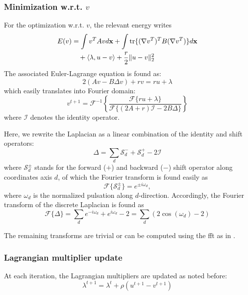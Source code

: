 \subsubsection{Minimization w.r.t. $v$}
For the optimization w.r.t. $v$, the relevant energy writes
\begin{align}
E(v) &= \int v^T A v d\mathbf{x} + \int \operatorname{tr}\{(\nabla v^T)^T B (\nabla v^T)\} d\mathbf{x}\\
&\quad + \langle \lambda, u-v \rangle + \frac{r}{2} \| u - v \|_2^2\nonumber
\end{align}
The associated Euler-Lagrange equation is found as:
\begin{equation}
2 ( A v - B \Delta v ) + rv = ru + \lambda
\end{equation}
which easily translates into Fourier domain:
\begin{equation}
v^{t+1} = \mathcal{F}^{-1}\left\{ \frac{\mathcal{F}\{ru + \lambda\}}{\mathcal{F}\{( 2 A+r)\mathcal{I}-2 B \Delta\}} \right\}
\end{equation}
where $\mathcal{I}$ denotes the identity operator.

Here, we rewrite the Laplacian as a linear combination of the identity and shift operators:
\begin{equation}
\Delta = \sum\limits_d \mathcal{S}_d^- + \mathcal{S}_d^+ - 2 \mathcal{I}
\end{equation}
where $\mathcal{S}_{d}^{\pm}$ stands for the forward ($+$) and backward ($-$) shift 
operator along coordinates axis $d$, of which the Fourier transform is found easily as
\begin{equation}
\mathcal{F}\{\mathcal{S}_{d}^{\pm}\} = e^{\pm i\omega_{d}},
\end{equation}
where $\omega_{d}$ is the normalized pulsation along $d$-direction. Accordingly, the 
Fourier transform of the discrete Laplacian is found as
\begin{equation}
\mathcal{F}\{\Delta\} = \sum\limits_d e^{-i\omega_d } + e^{i\omega_d } - 2 = \sum\limits_d \left( 2\cos(\omega_d) - 2 \right)
\end{equation}

The remaining transforms are trivial or can be computed using the \gls{fft} 
as in \citep{estellers_efficient_2011}.


\subsubsection{Lagrangian multiplier update}
At each iteration, the Lagrangian multipliers are updated as noted before:
\begin{equation}
\lambda^{t+1} = \lambda^t + \rho(u^{t+1}-v^{t+1})
\end{equation}

